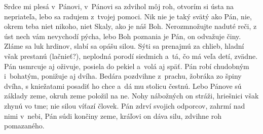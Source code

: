 Srdce mi plesá v~Pánovi,
v~Pánovi sa zdvihol môj roh,
\versseparator
otvorím si ústa na nepriateľa,
lebo sa radujem z~tvojej pomoci.
\versseparator
Nik nie je taký svätý ako Pán,
nie, okrem teba niet nikoho,
niet Skaly, ako je náš Boh.
\versseparator
Nerozmnožujte naduté reči,
z úst nech vám nevychodí pýcha,
\versseparator
lebo Boh poznania je Pán,
on odvažuje činy.
\versseparator
Zláme sa luk hrdinov,
slabí sa opášu silou.
\versseparator
Sýti sa prenajmú za chlieb,
hladní však prestanú (lačnieť?),
\versseparator
neplodná porodí siedmich
a~tá, čo má veľa detí, zvädne.
\versseparator
Pán usmrcuje aj oživuje,
posiela do pekiel a~volá aj späť.
\versseparator
Pán robí chudobným i~bohatým,
ponižuje aj dvíha.
\versseparator
Bedára pozdvihne z~prachu,
žobráka zo špiny dvíha,
\versseparator
s kniežatami posadiť ho chce
a~dá mu stolicu čestnú.
\versseparator
Lebo Pánove sú základy zeme,
okruh zeme položil na ne.
\versseparator
Nohy nábožných on stráži,
hriešnici však zhynú vo tme;
nie silou víťazí človek.
\versseparator
Pán zdrví svojich odporcov,
zahrmí nad nimi v~nebi,
\versseparator
Pán súdi končiny zeme,
kráľovi on dáva silu,
zdvihne roh pomazaného.